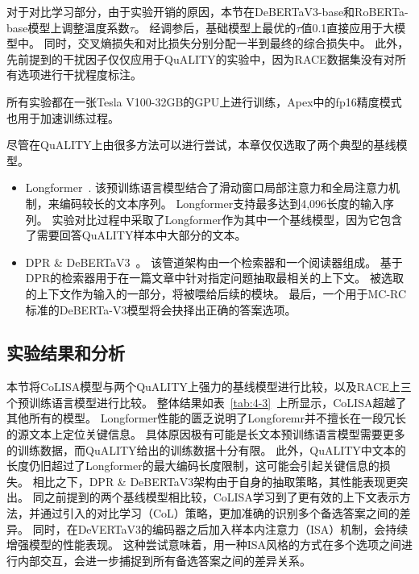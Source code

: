 对于对比学习部分，由于实验开销的原因，本节在DeBERTaV3-base和RoBERTa-base模型上调整温度系数$\tau$。
经调参后，基础模型上最优的$\tau$值0.1直接应用于大模型中。
同时，交叉熵损失和对比损失分别分配一半到最终的综合损失中。
此外，先前提到的干扰因子仅仅应用于QuALITY的实验中，因为RACE数据集没有对所有选项进行干扰程度标注。

所有实验都在一张Tesla V100-32GB的GPU上进行训练，Apex中的fp16精度模式也用于加速训练过程。

尽管在QuALITY上由很多方法可以进行尝试，本章仅仅选取了两个典型的基线模型。

\begin{itemize}
    \item Longformer~\cite{beltagy2020longformer}. 
        该预训练语言模型结合了滑动窗口局部注意力和全局注意力机制，来编码较长的文本序列。
        Longformer支持最多达到4,096长度的输入序列。
        实验对比过程中采取了Longformer作为其中一个基线模型，因为它包含了需要回答QuALITY样本中大部分的文本。
    \item DPR \& DeBERTaV3~\cite{karpukhin2020dense,he2021debertav3}。
        该管道架构由一个检索器和一个阅读器组成。
        基于DPR的检索器用于在一篇文章中针对指定问题抽取最相关的上下文。
        被选取的上下文作为输入的一部分，将被喂给后续的模块。
        最后，一个用于MC-RC标准的DeBERTa-V3模型将会抉择出正确的答案选项。
\end{itemize}

\subsection{实验结果和分析}



本节将CoLISA模型与两个QuALITY上强力的基线模型进行比较，以及RACE上三个预训练语言模型进行比较。
整体结果如表~\ref{tab:4-3}~上所显示，CoLISA超越了其他所有的模型。
Longformer性能的匮乏说明了Longforemr并不擅长在一段冗长的源文本上定位关键信息。
具体原因极有可能是长文本预训练语言模型需要更多的训练数据，而QuALITY给出的训练数据十分有限。
此外，QuALITY中文本的长度仍旧超过了Longformer的最大编码长度限制，这可能会引起关键信息的损失。
相比之下，DPR \& DeBERTaV3架构由于自身的抽取策略，其性能表现更突出。
同之前提到的两个基线模型相比较，CoLISA学习到了更有效的上下文表示方法，并通过引入的对比学习（CoL）策略，更加准确的识别多个备选答案之间的差异。
同时，在DeVERTaV3的编码器之后加入样本内注意力（ISA）机制，会持续增强模型的性能表现。
这种尝试意味着，用一种ISA风格的方式在多个选项之间进行内部交互，会进一步捕捉到所有备选答案之间的差异关系。


